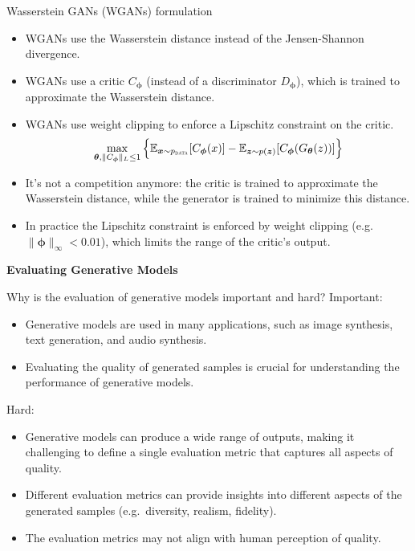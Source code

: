 \documentclass[11pt,aspectratio=169,usenames,dvipsnames]{beamer}
\newcommand{\bs}{\boldsymbol}
\begin{document}
\begin{frame}{Wasserstein GANs (WGANs) formulation}
  \begin{itemize}
  \item WGANs use the Wasserstein distance instead of the Jensen-Shannon divergence.
  \item WGANs use a critic $C_{\bs{\phi}}$ (instead of a discriminator $D_{\bs{\phi}}$), which is trained to approximate the Wasserstein distance.
  \item WGANs use weight clipping to enforce a Lipschitz constraint on the critic.
  \begin{align*}
  \max_{\bs{\theta},\|C_{\bs{\phi}}\|_L\leq 1} \Big\{\mathbb{E}_{\bs{x}\sim p_{\textsc{data}}}[C_{\bs{\phi}}(x)] - \mathbb{E}_{\bs{z}\sim p(\bs{z})}[C_{\bs{\phi}}(G_{\bs{\theta}}(z))]\Big\}
  \end{align*}\pause
  \item It's not a competition anymore: the critic is trained to approximate the Wasserstein distance, while the generator is trained to minimize this distance.
  \item In practice the Lipschitz constraint is enforced by weight clipping (e.g.\ $\|\bs{\phi}\|_{\infty}<0.01$), which limits the range of the critic's output.
  \end{itemize}

\end{frame}

{
\begin{frame}
  \centering \color{white}\large\bf
  Evaluating Generative Models
\end{frame}
}

\begin{frame}{Why is the evaluation of generative models important and hard?}
Important:
  \begin{itemize}
  \item Generative models are used in many applications, such as image synthesis, text generation, and audio synthesis.
  \item Evaluating the quality of generated samples is crucial for understanding the performance of generative models.
   \end{itemize}\pause
Hard:
  \begin{itemize}
  \item Generative models can produce a wide range of outputs, making it challenging to define a single evaluation metric that captures all aspects of quality.
  \item Different evaluation metrics can provide insights into different aspects of the generated samples (e.g.\ diversity, realism, fidelity).
  \item The evaluation metrics may not align with human perception of quality.
  \end{itemize}
\end{frame}
\end{document}
